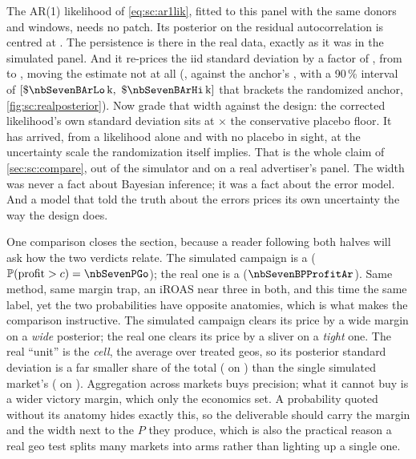 The AR(1) likelihood of \cref{eq:sc:ar1lik}, fitted to this panel with the same donors and windows,
needs no patch. Its posterior on the residual autocorrelation is centred at \nbSevenBArRho{}. The
persistence is there in the real data, exactly as it was in the simulated panel. And it re-prices
the iid standard deviation by a factor of \nbSevenBArVsIid{}, from \kusd{\nbSevenBBayesSd} to
\kusd{\nbSevenBArSd}, moving the estimate not at all (\kusd{\nbSevenBArTotal}, against the anchor's
\kusd{\nbSevenBDidTotal}, with a 90\,\% interval of
$[\kusd{\nbSevenBArLo},\ \kusd{\nbSevenBArHi}]$ that brackets the randomized anchor,
\cref{fig:sc:realposterior}). Now grade that width against the design: the
corrected likelihood's own standard deviation sits at \nbSevenBArVsFloor$\times$ the conservative
placebo floor. It has arrived, from a likelihood alone and with no placebo in sight, at the
uncertainty scale the randomization itself implies. That is the whole claim of
\cref{sec:sc:compare}, out of the simulator and on a real advertiser's panel. The width was never
a fact about Bayesian inference; it was a fact about the error model. And a model that told the truth
about the errors prices its own uncertainty the way the design does.

One comparison closes the section, because a reader following both halves will ask how the two
verdicts relate. The simulated campaign is a \nbSevenDecision{} ($\Prob(\text{profit} > c) =
\nbSevenPGo$); the real one is a \nbSevenBDecision{} ($\nbSevenBPProfitAr$). Same method, same margin
trap, an iROAS near three in both, and this time the same label, yet the two probabilities have
opposite anatomies, which is what makes the comparison instructive. The simulated campaign clears its
price by a wide margin on a \emph{wide} posterior; the real one clears its price by a sliver on a
\emph{tight} one. The real ``unit'' is the \emph{cell}, the average over \nbSevenBNTreated{} treated
geos, so its posterior standard deviation is a far smaller share of the total (\kusd{\nbSevenBArSd} on
\kusd{\nbSevenBArTotal}) than the single simulated market's (\keur{\nbSevenBayesSd} on
\keur{\nbSevenBayesTotal}). Aggregation across markets buys precision; what it cannot buy is a wider
victory margin, which only the economics set. A probability quoted without its anatomy hides exactly
this, so the deliverable should carry the margin and the width next to the $P$ they produce, which is
also the practical reason a real geo test splits many markets into arms rather than lighting up a
single one.


